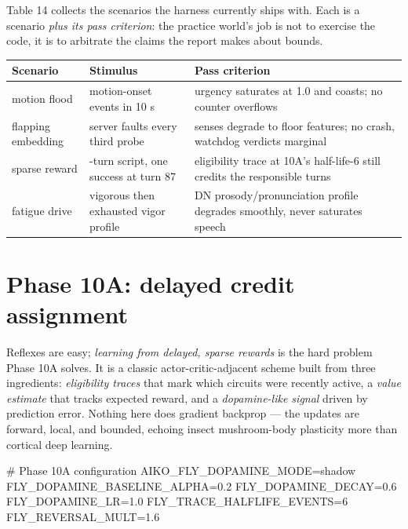 \documentclass[11pt]{article}
\begin{document}
Table 14 collects the scenarios the harness currently ships with. Each is a scenario \emph{plus its pass criterion}: the practice world's job is not to exercise the code, it is to arbitrate the claims the report makes about bounds.

{\small
{}
\begin{longtable}{@{}>{\raggedright\arraybackslash}p{} >{\raggedright\arraybackslash}p{} >{\raggedright\arraybackslash}p{}@{}}
\toprule
\textbf{Scenario} & \textbf{Stimulus} & \textbf{Pass criterion} \\
\midrule
motion flood & 200 motion-onset events in 10 s & urgency saturates at 1.0 and coasts; no counter overflows \\
flapping embedding & server faults every third probe & senses degrade to floor features; no crash, watchdog verdicts marginal \\
sparse reward & 100-turn script, one success at turn 87 & eligibility trace at 10A's half-life-6 still credits the responsible turns \\
fatigue drive & vigorous then exhausted vigor profile & DN prosody/pronunciation profile degrades smoothly, never saturates speech \\
\bottomrule
\end{longtable}
}

\section{Phase 10A: delayed credit assignment}

Reflexes are easy; \emph{learning from delayed, sparse rewards} is the hard problem Phase 10A solves. It is a classic actor-critic-adjacent scheme built from three ingredients: \emph{eligibility traces} that mark which circuits were recently active, a \emph{value estimate} that tracks expected reward, and a \emph{dopamine-like signal} driven by prediction error. Nothing here does gradient backprop — the updates are forward, local, and bounded, echoing insect mushroom-body plasticity more than cortical deep learning.

\begin{CodeBlock}
# Phase 10A configuration
AIKO_FLY_DOPAMINE_MODE=shadow
FLY_DOPAMINE_BASELINE_ALPHA=0.2
FLY_DOPAMINE_DECAY=0.6
FLY_DOPAMINE_LR=1.0
FLY_TRACE_HALFLIFE_EVENTS=6
FLY_REVERSAL_MULT=1.6
\end{CodeBlock}
\end{document}
